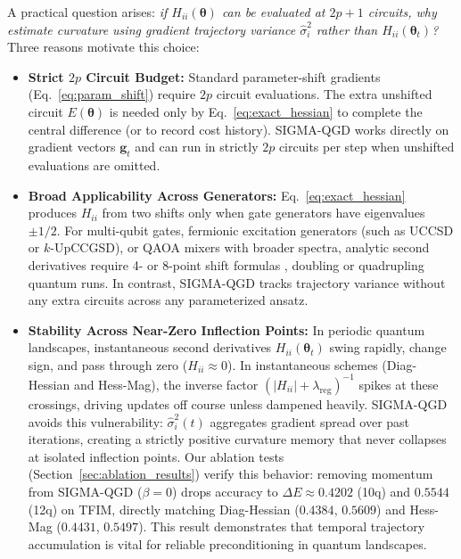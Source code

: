 \documentclass[11pt,a4paper]{article}
\begin{document}
A practical question arises: \emph{if $H_{ii}(\boldsymbol{\theta})$ can be evaluated at $2p+1$ circuits, why estimate curvature using gradient trajectory variance $\hat{\sigma}_i^2$ rather than $H_{ii}(\boldsymbol{\theta}_t)$?} Three reasons motivate this choice:
\begin{itemize}
    \item \textbf{Strict $2p$ Circuit Budget:} Standard parameter-shift gradients (Eq.~\eqref{eq:param_shift}) require $2p$ circuit evaluations. The extra unshifted circuit $E(\boldsymbol{\theta})$ is needed only by Eq.~\eqref{eq:exact_hessian} to complete the central difference (or to record cost history). SIGMA-QGD works directly on gradient vectors $\mathbf{g}_t$ and can run in strictly $2p$ circuits per step when unshifted evaluations are omitted.
    \item \textbf{Broad Applicability Across Generators:} Eq.~\eqref{eq:exact_hessian} produces $H_{ii}$ from two shifts only when gate generators have eigenvalues $\pm 1/2$. For multi-qubit gates, fermionic excitation generators (such as UCCSD or $k$-UpCCGSD), or QAOA mixers with broader spectra, analytic second derivatives require 4- or 8-point shift formulas \cite{wierichs2022general}, doubling or quadrupling quantum runs. In contrast, SIGMA-QGD tracks trajectory variance without any extra circuits across any parameterized ansatz.
    \item \textbf{Stability Across Near-Zero Inflection Points:} In periodic quantum landscapes, instantaneous second derivatives $H_{ii}(\boldsymbol{\theta}_t)$ swing rapidly, change sign, and pass through zero ($H_{ii} \approx 0$). In instantaneous schemes (Diag-Hessian and Hess-Mag), the inverse factor $(|H_{ii}| + \lambda_{\text{reg}})^{-1}$ spikes at these crossings, driving updates off course unless dampened heavily. SIGMA-QGD avoids this vulnerability: $\hat{\sigma}_i^2(t)$ aggregates gradient spread over past iterations, creating a strictly positive curvature memory that never collapses at isolated inflection points. Our ablation tests (Section~\ref{sec:ablation_results}) verify this behavior: removing momentum from SIGMA-QGD ($\beta=0$) drops accuracy to $\Delta E \approx 0.4202$ (10q) and $0.5544$ (12q) on TFIM, directly matching Diag-Hessian ($0.4384$, $0.5609$) and Hess-Mag ($0.4431$, $0.5497$). This result demonstrates that temporal trajectory accumulation is vital for reliable preconditioning in quantum landscapes.
\end{itemize}
\end{document}
